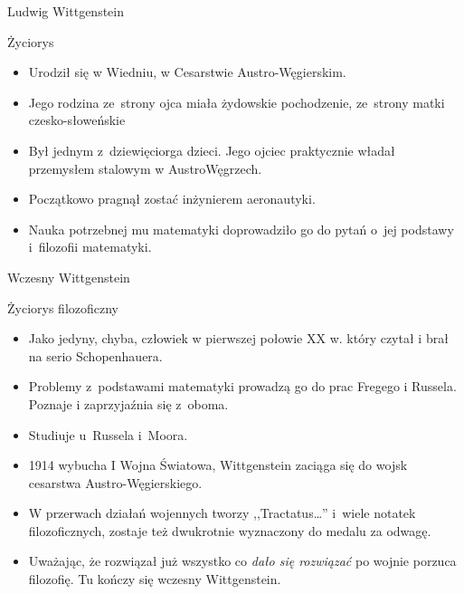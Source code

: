\begin{frame}{Ludwig Wittgenstein}
\begin{block}{Życiorys}
\begin{itemize}
\item Urodził się w Wiedniu, w Cesarstwie Austro-Węgierskim.
\item Jego rodzina ze~strony ojca miała żydowskie pochodzenie, ze~strony matki czesko-słoweńskie
\item Był jednym z~dziewięciorga dzieci. Jego ojciec praktycznie władał przemysłem stalowym w Austro\dywiz Węgrzech.
\item Początkowo pragnął zostać inżynierem aeronautyki.
\item Nauka potrzebnej mu matematyki doprowadziło go do pytań o~jej podstawy i~filozofii matematyki.
\end{itemize}
\end{block}
\end{frame}

\begin{frame}{Wczesny Wittgenstein}
\begin{block}{Życiorys filozoficzny}
\begin{itemize}
\item Jako jedyny, chyba, człowiek w pierwszej połowie XX w. który czytał i brał na serio Schopenhauera.
\item Problemy z~podstawami matematyki prowadzą go do prac Fregego i Russela. Poznaje i zaprzyjaźnia się z~oboma.
\item Studiuje u~Russela i~Moora.
\item 1914 wybucha I Wojna Światowa, Wittgenstein zaciąga się do wojsk cesarstwa Austro-Węgierskiego.
\item W przerwach działań wojennych tworzy ,,Tractatus\ldots '' i~wiele notatek filozoficznych, zostaje też dwukrotnie wyznaczony do medalu za odwagę.
\item Uważając, że rozwiązał już wszystko co \emph{dało się rozwiązać} po wojnie porzuca filozofię. Tu kończy się wczesny Wittgenstein.
\end{itemize}
\end{block}
\end{frame}

